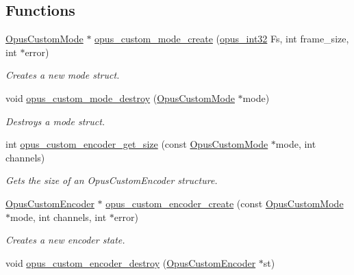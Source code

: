 \subsection*{Functions}
\begin{DoxyCompactItemize}
\item 
\hyperlink{group__opus__custom_gaf33847c711195b9edef896b73c96ec4f}{Opus\+Custom\+Mode} $\ast$ \hyperlink{group__opus__custom_ga8d6683d0b9f2990a8f54d8bafe4f4027}{opus\+\_\+custom\+\_\+mode\+\_\+create} (\hyperlink{opus__types_8h_aa4d309d6f80b99dbabebc8f98879ab9a}{opus\+\_\+int32} Fs, int frame\+\_\+size, int $\ast$error)
\begin{DoxyCompactList}\small\item\em Creates a new mode struct. \end{DoxyCompactList}\item 
void \hyperlink{group__opus__custom_ga1333ad19db2acd8edf558ac6365741de}{opus\+\_\+custom\+\_\+mode\+\_\+destroy} (\hyperlink{group__opus__custom_gaf33847c711195b9edef896b73c96ec4f}{Opus\+Custom\+Mode} $\ast$mode)
\begin{DoxyCompactList}\small\item\em Destroys a mode struct. \end{DoxyCompactList}\item 
int \hyperlink{group__opus__custom_ga42f50e7f2942144c18c321f00f358ba0}{opus\+\_\+custom\+\_\+encoder\+\_\+get\+\_\+size} (const \hyperlink{group__opus__custom_gaf33847c711195b9edef896b73c96ec4f}{Opus\+Custom\+Mode} $\ast$mode, int channels)
\begin{DoxyCompactList}\small\item\em Gets the size of an Opus\+Custom\+Encoder structure. \end{DoxyCompactList}\item 
\hyperlink{group__opus__custom_ga7abe6a7afc599667950251c987feb439}{Opus\+Custom\+Encoder} $\ast$ \hyperlink{group__opus__custom_ga5aa778f7b0d93b397c1c0fb04b59eb02}{opus\+\_\+custom\+\_\+encoder\+\_\+create} (const \hyperlink{group__opus__custom_gaf33847c711195b9edef896b73c96ec4f}{Opus\+Custom\+Mode} $\ast$mode, int channels, int $\ast$error)
\begin{DoxyCompactList}\small\item\em Creates a new encoder state. \end{DoxyCompactList}\item 
void \hyperlink{group__opus__custom_ga5ed5b55bccdc141632d8ba65b8228e7d}{opus\+\_\+custom\+\_\+encoder\+\_\+destroy} (\hyperlink{group__opus__custom_ga7abe6a7afc599667950251c987feb439}{Opus\+Custom\+Encoder} $\ast$st)

\end{DoxyCompactItemize}
